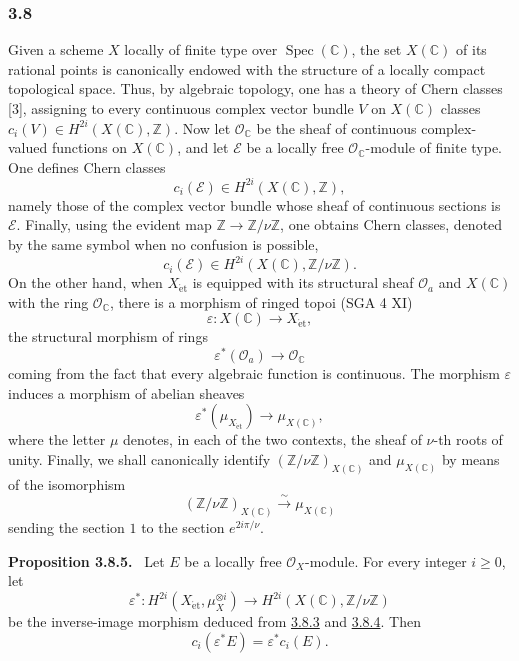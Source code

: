 \documentclass[11pt]{article}
\newenvironment{statement}[1]{\par\medskip\noindent\textbf{#1.}\ }{\par\medskip}
\providecommand{\et}{\mathrm{\acute{e}t}}
\providecommand{\et}{\acute{e}t}
\begin{document}
\subsubsection*{3.8}\label{sga5:VII:subsubsection:3.8}
Given a scheme $X$ locally of finite type over $\operatorname{Spec}(\mathbb C)$, the set $X(\mathbb C)$ of its rational points is canonically endowed with the structure of a locally compact topological space. Thus, by algebraic topology, one has a theory of Chern classes [3], assigning to every continuous complex vector bundle $V$ on $X(\mathbb C)$ classes $c_i(V)\in H^{2i}(X(\mathbb C),\mathbb Z)$. Now let $\mathcal O_\mathbb C$ be the sheaf of continuous complex-valued functions on $X(\mathbb C)$, and let $\mathcal E$ be a locally free $\mathcal O_\mathbb C$-module of finite type. One defines Chern classes
\[
c_i(\mathcal E)\in H^{2i}(X(\mathbb C),\mathbb Z),
\]
namely those of the complex vector bundle whose sheaf of continuous sections is $\mathcal E$. Finally, using the evident map $\mathbb Z\to\mathbb Z/\nu\mathbb Z$, one obtains Chern classes, denoted by the same symbol when no confusion is possible,
\[
c_i(\mathcal E)\in H^{2i}(X(\mathbb C),\mathbb Z/\nu\mathbb Z).
\tag{3.8.1}\label{sga5:VII:equation:3.8.1}
\]
On the other hand, when $X_{\et}$ is equipped with its structural sheaf $\mathcal O_a$ and $X(\mathbb C)$ with the ring $\mathcal O_\mathbb C$, there is a morphism of ringed topoi (SGA 4 XI)
\[
\varepsilon:X(\mathbb C)\to X_{\et},
\]
the structural morphism of rings
\[
\varepsilon^*(\mathcal O_a)\to\mathcal O_\mathbb C
\tag{3.8.2}\label{sga5:VII:equation:3.8.2}
\]
coming from the fact that every algebraic function is continuous. The morphism $\varepsilon$ induces a morphism of abelian sheaves
\[
\varepsilon^*(\mu_{X_{\et}})\to \mu_{X(\mathbb C)},
\tag{3.8.3}\label{sga5:VII:equation:3.8.3}
\]
where the letter $\mu$ denotes, in each of the two contexts, the sheaf of $\nu$-th roots of unity. Finally, we shall canonically identify $(\mathbb Z/\nu\mathbb Z)_{X(\mathbb C)}$ and $\mu_{X(\mathbb C)}$ by means of the isomorphism
\[
(\mathbb Z/\nu\mathbb Z)_{X(\mathbb C)}
 \xrightarrow{\sim}\mu_{X(\mathbb C)}
\tag{3.8.4}\label{sga5:VII:equation:3.8.4}
\]
sending the section $1$ to the section $e^{2i\pi/\nu}$.

\label{sga5:VII:proposition:3.8.5}\begin{statement}{Proposition 3.8.5}
Let $E$ be a locally free $\mathcal O_X$-module. For every integer $i\ge0$, let
\[
\varepsilon^*:H^{2i}(X_{\et},\mu_X^{\otimes i})
\to H^{2i}(X(\mathbb C),\mathbb Z/\nu\mathbb Z)
\]
be the inverse-image morphism deduced from \hyperref[sga5:VII:equation:3.8.3]{3.8.3} and \hyperref[sga5:VII:equation:3.8.4]{3.8.4}. Then
\[
c_i(\varepsilon^*E)=\varepsilon^*c_i(E).
\]
\end{statement}
\end{document}
